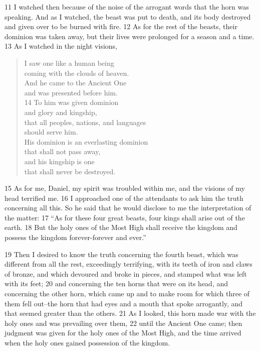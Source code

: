 11 I watched then because of the noise of the arrogant words that the horn was 
speaking. And as I watched, the beast was put to death, and its body destroyed 
and given over to be burned with fire. 12 As for the rest of the beasts, their 
dominion was taken away, but their lives were prolonged for a season and a time.
13 As I watched in the night visions,

\begin{verse}
I saw one like a human being \\
\hspace{1.5em} coming with the clouds of heaven. \\
And he came to the Ancient One \\
    \hspace{1.5em}    and was presented before him. \\
14 To him was given dominion \\
\hspace{1.5em}    and glory and kingship, \\
that all peoples, nations, and languages \\
\hspace{1.5em}    should serve him. \\
His dominion is an everlasting dominion \\
\hspace{1.5em}    that shall not pass away, \\
and his kingship is one \\
\hspace{1.5em}    that shall never be destroyed. \\
\end{verse}

15 As for me, Daniel, my spirit was troubled within me, and the visions of my 
head terrified me. 16 I approached one of the attendants to ask him the truth 
concerning all this. So he said that he would disclose to me the interpretation 
of the matter: 17 ``As for these four great beasts, four kings shall arise out of 
the earth. 18 But the holy ones of the Most High shall receive the kingdom and 
possess the kingdom forever-forever and ever.''

19 Then I desired to know the truth concerning the fourth beast, which was 
different from all the rest, exceedingly terrifying, with its teeth of iron and 
claws of bronze, and which devoured and broke in pieces, and stamped what was 
left with its feet; 20 and concerning the ten horns that were on its head, and 
concerning the other horn, which came up and to make room for which three of 
them fell out--the horn that had eyes and a mouth that spoke arrogantly, and that 
seemed greater than the others. 21 As I looked, this horn made war with the holy 
ones and was prevailing over them, 22 until the Ancient One came; then 
judgment was given for the holy ones of the Most High, and the time arrived when 
the holy ones gained possession of the kingdom.

